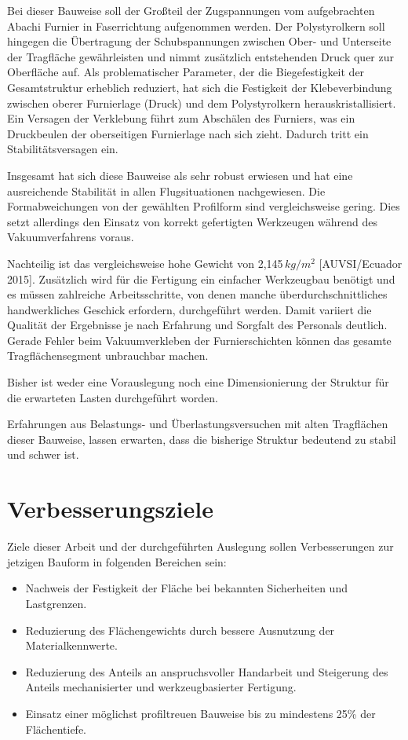 Bei dieser Bauweise soll der Großteil der Zugspannungen vom aufgebrachten Abachi Furnier in Faserrichtung aufgenommen werden. Der Polystyrolkern soll hingegen die Übertragung der Schubspannungen zwischen Ober- und Unterseite der Tragfläche gewährleisten und nimmt zusätzlich entstehenden Druck quer zur Oberfläche auf. Als problematischer Parameter, der die Biegefestigkeit der Gesamtstruktur erheblich reduziert, hat sich die Festigkeit der Klebeverbindung zwischen oberer Furnierlage (Druck) und dem Polystyrolkern herauskristallisiert. Ein Versagen der Verklebung führt zum Abschälen des Furniers, was ein Druckbeulen der oberseitigen Furnierlage nach sich zieht. Dadurch tritt ein Stabilitätsversagen ein.

Insgesamt hat sich diese Bauweise als sehr robust erwiesen und hat eine ausreichende Stabilität in allen Flugsituationen nachgewiesen.
Die Formabweichungen von der gewählten Profilform sind vergleichsweise gering. Dies setzt allerdings den Einsatz von korrekt gefertigten Werkzeugen während des Vakuumverfahrens voraus. 

Nachteilig ist das vergleichsweise hohe Gewicht von 2,145\,$kg/m^2$ [AUVSI/Ecuador 2015].
Zusätzlich wird für die Fertigung ein einfacher Werkzeugbau benötigt und es müssen zahlreiche Arbeitsschritte, von denen manche überdurchschnittliches handwerkliches Geschick erfordern, durchgeführt werden. Damit variiert die Qualität der Ergebnisse je nach Erfahrung und Sorgfalt des Personals deutlich. Gerade Fehler beim Vakuumverkleben der Furnierschichten können das gesamte Tragflächensegment unbrauchbar machen. 

Bisher ist weder eine Vorauslegung noch eine Dimensionierung der Struktur für die erwarteten Lasten durchgeführt worden.

Erfahrungen aus Belastungs- und Überlastungsversuchen mit alten Tragflächen dieser Bauweise, lassen erwarten, dass die bisherige Struktur bedeutend zu stabil und schwer ist. 

\clearpage

\section{Verbesserungsziele}

Ziele dieser Arbeit und der durchgeführten Auslegung sollen Verbesserungen zur jetzigen Bauform in folgenden Bereichen sein:
\begin{itemize}
    \item Nachweis der Festigkeit der Fläche bei bekannten Sicherheiten und Lastgrenzen.
    \item Reduzierung des Flächengewichts durch bessere Ausnutzung der Materialkennwerte.
    \item Reduzierung des Anteils an anspruchsvoller Handarbeit und Steigerung des Anteils mechanisierter und werkzeugbasierter Fertigung.
    \item Einsatz einer möglichst profiltreuen Bauweise bis zu mindestens 25\% der Flächentiefe.
    \label{lst:Verbesserungsziele}
\end{itemize}


